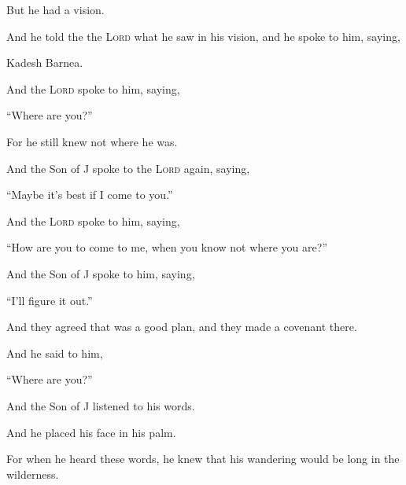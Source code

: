 \Sentence
{ \hX{} }
{ \eX{} }
{
But he had a vision.

    And he told the the \textsc{Lord} what he saw in his vision, and he spoke to him, saying,
}
\Sentence
{ \hX{} }
{ \eX{} }
{
    Kadesh Barnea.
    \begin{center}
    \end{center}
}
\Sentence
{ \hX{} }
{ \eX{} }
{
And the \textsc{Lord} spoke to him, saying,

	``Where are you?''

    For he still knew not where he was.
}

\Sentence
{ \hX{} }
{ \eX{} }
{
And the Son of J spoke to the \textsc{Lord} again, saying,
	
	``Maybe it's best if I come to you.''
}

\Sentence
{ \hX{} }
{ \eX{} }
{
And the \textsc{Lord} spoke to him, saying,

	``How are you to come to me, when you know not where you are?''
}

\Sentence
{ \hX{} }
{ \eX{} }
{
And the Son of J spoke to him, saying,

	``I'll figure it out.''
}

\Sentence
{ \hX{} }
{ \eX{} }
{
And they agreed that was a good plan, and they made a covenant there.

	And he said to him,

	``Where are you?''
}

\Sentence
{ \hX{} }
{ \eX{} }
{
And the Son of J listened to his words.

	And he placed his face in his palm.
	
	For when he heard these words, he knew that his wandering would be long in the wilderness.
}
